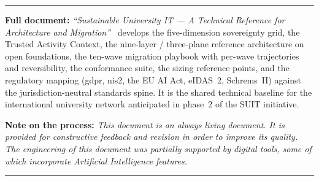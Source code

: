 \documentclass[11pt,a4paper]{article}
\begin{document}
\vspace{0.4em}
\noindent\rule{\textwidth}{0.4pt}

{\footnotesize\textbf{Full document:} \emph{``Sustainable University IT --- A
Technical Reference for Architecture and Migration''}~\cite{ng-tech-ref-2026}
develops the five-dimension sovereignty grid, the Trusted Activity Context,
the nine-layer / three-plane reference architecture on open foundations, the
ten-wave migration playbook with per-wave trajectories and reversibility, the
conformance suite, the sizing reference points, and the regulatory mapping
(\gls{gdpr}, \gls{nis2}, the EU AI Act, eIDAS~2, Schrems~II) against the
jurisdiction-neutral standards spine. It is the shared technical baseline for
the international university network anticipated in phase~2 of the SUIT
initiative.}

\smallskip

{\footnotesize\textbf{Note on the process:}
\textit{This document is an always living document. It is provided for
constructive feedback and revision in order to improve its quality. The
engineering of this document was partially supported by digital tools, some
of which incorporate Artificial Intelligence features.}}

\vspace{0.6em}
\noindent\rule{\textwidth}{0.4pt}
\printbibliography[title={\normalsize References}]
\end{document}
